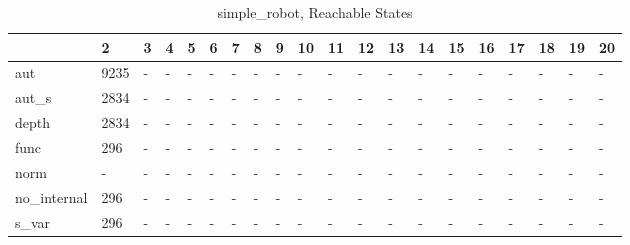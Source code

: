 \begin{table}
\caption{simple_robot, Reachable States}
\label{simple_robot_reach}
\begin{tabular}{llllllllllllllllllll}
\toprule
 & 2 & 3 & 4 & 5 & 6 & 7 & 8 & 9 & 10 & 11 & 12 & 13 & 14 & 15 & 16 & 17 & 18 & 19 & 20 \\
\midrule
aut & 9235 & - & - & - & - & - & - & - & - & - & - & - & - & - & - & - & - & - & - \\
aut_s & 2834 & - & - & - & - & - & - & - & - & - & - & - & - & - & - & - & - & - & - \\
depth & 2834 & - & - & - & - & - & - & - & - & - & - & - & - & - & - & - & - & - & - \\
func & 296 & - & - & - & - & - & - & - & - & - & - & - & - & - & - & - & - & - & - \\
norm & - & - & - & - & - & - & - & - & - & - & - & - & - & - & - & - & - & - & - \\
no_internal & 296 & - & - & - & - & - & - & - & - & - & - & - & - & - & - & - & - & - & - \\
s_var & 296 & - & - & - & - & - & - & - & - & - & - & - & - & - & - & - & - & - & - \\
\bottomrule
\end{tabular}
\end{table}
